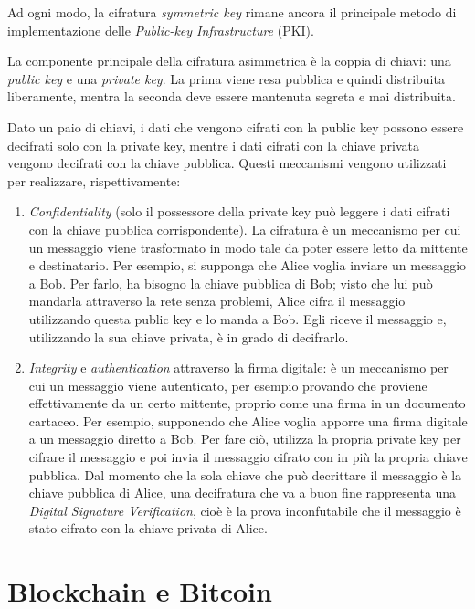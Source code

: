Ad ogni modo, la cifratura \textit{symmetric key} rimane ancora il principale metodo di implementazione delle \textit{Public-key Infrastructure} (PKI).

La componente principale della cifratura asimmetrica è la coppia di chiavi: una \textit{public key} e una \textit{private key}. La prima viene resa pubblica e quindi distribuita liberamente, mentra la seconda deve essere mantenuta segreta e mai distribuita. 

Dato un paio di chiavi, i dati che vengono cifrati con la public key possono essere decifrati solo con la private key, mentre i dati cifrati con la chiave privata vengono decifrati con la chiave pubblica. Questi meccanismi vengono utilizzati per realizzare, rispettivamente:
\begin{enumerate}
    \item \textit{Confidentiality} (solo il possessore della private key può leggere i dati cifrati con la chiave pubblica corrispondente). La cifratura è un meccanismo per cui un messaggio viene trasformato in modo tale da poter essere letto da mittente e destinatario. Per esempio, si supponga che Alice voglia inviare un messaggio a Bob. Per farlo, ha bisogno la chiave pubblica di Bob; visto che lui può mandarla attraverso la rete senza problemi, Alice cifra il messaggio utilizzando questa public key e lo manda a Bob. Egli riceve il messaggio e, utilizzando la sua chiave privata, è in grado di decifrarlo.
    \item \textit{Integrity} e \textit{authentication} attraverso la firma digitale: è un meccanismo per cui un messaggio viene autenticato, per esempio provando che proviene effettivamente da un certo mittente, proprio come una firma in un documento cartaceo. Per esempio, supponendo che Alice voglia apporre una firma digitale a un messaggio diretto a Bob. Per fare ciò, utilizza la propria private key per cifrare il messaggio e poi invia il messaggio cifrato con in più la propria chiave pubblica. Dal momento che la sola chiave che può decrittare il messaggio è la chiave pubblica di Alice, una decifratura che va a buon fine rappresenta una \textit{Digital Signature Verification}, cioè è la prova inconfutabile che il messaggio è stato cifrato con la chiave privata di Alice.
\end{enumerate}


\section{Blockchain e Bitcoin}
\label{c:tec:blockchain}


